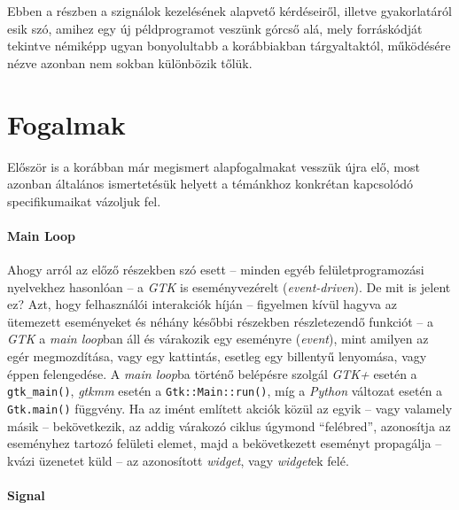Ebben a részben a szignálok kezelésének alapvető kérdéseiről, illetve gyakorlatáról esik szó, amihez egy új példprogramot veszünk górcső alá, mely forráskódját tekintve némiképp ugyan bonyolultabb a korábbiakban tárgyaltaktól, működésére nézve azonban nem sokban különbözik tőlük.

\section{Fogalmak}

Először is a korábban már megismert alapfogalmakat vesszük újra elő, most azonban általános ismertetésük helyett a témánkhoz konkrétan kapcsolódó specifikumaikat vázoljuk fel.

\paragraph{Main Loop}

Ahogy arról az előző részekben szó esett -- minden egyéb felületprogramozási nyelvekhez hasonlóan -- a \textit{GTK} is eseményvezérelt (\textit{event-driven}). De mit is jelent ez?  Azt, hogy felhasználói interakciók híján -- figyelmen kívül hagyva az ütemezett eseményeket és néhány későbbi részekben részletezendő funkciót -- a \textit{GTK} a \textit{main loop}ban áll és várakozik egy eseményre (\textit{event}), mint amilyen az egér megmozdítása, vagy egy kattintás, esetleg egy billentyű lenyomása, vagy éppen felengedése. A \textit{main loop}ba történő belépésre szolgál \textit{GTK+} esetén a \texttt{gtk\_main()}, \textit{gtkmm} esetén a \texttt{Gtk::Main::run()}, míg a \textit{Python} változat esetén a \texttt{Gtk.main()} függvény. Ha az imént említett akciók közül az egyik -- vagy valamely másik -- bekövetkezik, az addig várakozó ciklus úgymond ``felébred'', azonosítja az eseményhez tartozó felületi elemet, majd a bekövetkezett eseményt propagálja -- kvázi üzenetet küld -- az azonosított \textit{widget}, vagy \textit{widget}ek felé.

\paragraph{Signal}

